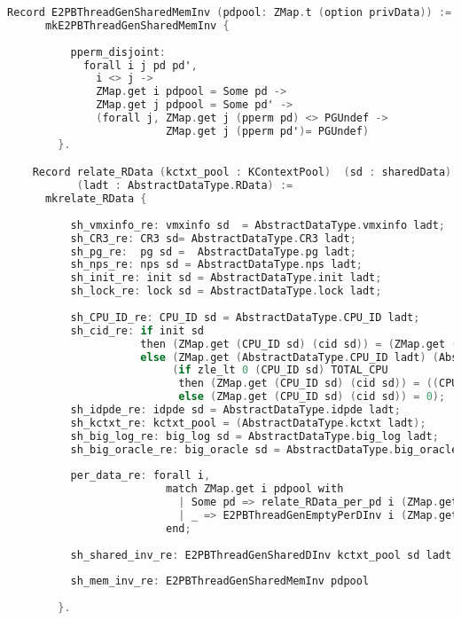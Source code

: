 \begin{lstlisting}[language=C]
    Record E2PBThreadGenSharedMemInv (pdpool: ZMap.t (option privData)) :=
      mkE2PBThreadGenSharedMemInv {
          
          pperm_disjoint: 
            forall i j pd pd',
              i <> j ->
              ZMap.get i pdpool = Some pd ->
              ZMap.get j pdpool = Some pd' ->
              (forall j, ZMap.get j (pperm pd) <> PGUndef ->
                         ZMap.get j (pperm pd')= PGUndef)
        }.

    Record relate_RData (kctxt_pool : KContextPool)  (sd : sharedData)  (pdpool: ZMap.t (option privData))
           (ladt : AbstractDataType.RData) :=
      mkrelate_RData {
          
          sh_vmxinfo_re: vmxinfo sd  = AbstractDataType.vmxinfo ladt;
          sh_CR3_re: CR3 sd= AbstractDataType.CR3 ladt;
          sh_pg_re:  pg sd =  AbstractDataType.pg ladt;
          sh_nps_re: nps sd = AbstractDataType.nps ladt;
          sh_init_re: init sd = AbstractDataType.init ladt;
          sh_lock_re: lock sd = AbstractDataType.lock ladt;
          
          sh_CPU_ID_re: CPU_ID sd = AbstractDataType.CPU_ID ladt;
          sh_cid_re: if init sd
                     then (ZMap.get (CPU_ID sd) (cid sd)) = (ZMap.get (AbstractDataType.CPU_ID ladt) (AbstractDataType.cid ladt))
                     else (ZMap.get (AbstractDataType.CPU_ID ladt) (AbstractDataType.cid ladt)) = 0 /\
                          (if zle_lt 0 (CPU_ID sd) TOTAL_CPU
                           then (ZMap.get (CPU_ID sd) (cid sd)) = ((CPU_ID sd) + 1)
                           else (ZMap.get (CPU_ID sd) (cid sd)) = 0);
          sh_idpde_re: idpde sd = AbstractDataType.idpde ladt;
          sh_kctxt_re: kctxt_pool = (AbstractDataType.kctxt ladt);
          sh_big_log_re: big_log sd = AbstractDataType.big_log ladt;
          sh_big_oracle_re: big_oracle sd = AbstractDataType.big_oracle ladt;
          
          per_data_re: forall i,
                         match ZMap.get i pdpool with 
                           | Some pd => relate_RData_per_pd i (ZMap.get i kctxt_pool) sd pd ladt
                           | _ => E2PBThreadGenEmptyPerDInv i (ZMap.get i kctxt_pool)  sd ladt
                         end;
          
          sh_shared_inv_re: E2PBThreadGenSharedDInv kctxt_pool sd ladt;
          
          sh_mem_inv_re: E2PBThreadGenSharedMemInv pdpool 
                                                    
        }.
\end{lstlisting}

